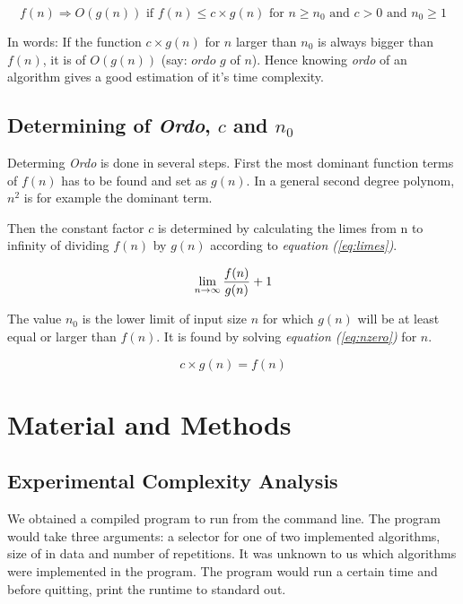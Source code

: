 \documentclass[a4paper,11pt,twoside]{article}
\begin{document}
\begin{equation} \label{eq:ordo}
f(n) \Rightarrow O(g(n)) \textrm{ if } f(n) \leq c \times g(n)
\textrm{ for } n \geq n_{0} \textrm{ and }
c > 0 \textrm{ and } n_{0} \geq 1
\end{equation}

In words: If the function $c \times g(n)$ for $n$ larger than $n_{0}$
is always bigger than $f(n)$, it is of $O(g(n))$ (say: $ordo$  $g$ of
$n$). Hence knowing \emph{ordo} of an algorithm gives a good estimation 
of it's time complexity.

\subsection{Determining of \textit{Ordo}, $c$ and $n_{0}$}
Determing \emph{Ordo} is done in several steps. First the most dominant
function terms of $f(n)$ has to be found and set as $g(n)$. In a
general second degree polynom, $n^2$ is for example the dominant term.

Then the constant factor $c$ is determined by calculating the limes
from n to infinity of dividing $f(n)$ by $g(n)$ according to
\textit{equation (\ref{eq:limes})}.  

\begin{equation} \label{eq:limes}
\lim_{n \to \infty} {f(n) \over g(n)} + 1
\end{equation}

The value $n_{0}$ is the lower limit of input size $n$ for which
$g(n)$ will be at least equal or larger than $f(n)$. It is found by
solving \textit{equation (\ref{eq:nzero})} for $n$. 

\begin{equation} \label{eq:nzero}
c\times g(n) = f(n)
\end{equation}


\section{Material and Methods}

\subsection{Experimental Complexity Analysis}
We obtained a compiled program to run from the command line. The
program would take three arguments: a selector for one of two
implemented algorithms, size of in data and number of repetitions. It
was unknown to us which algorithms were implemented in the
program. The program would run a certain time and before quitting, 
print the runtime to standard out.
\end{document}
